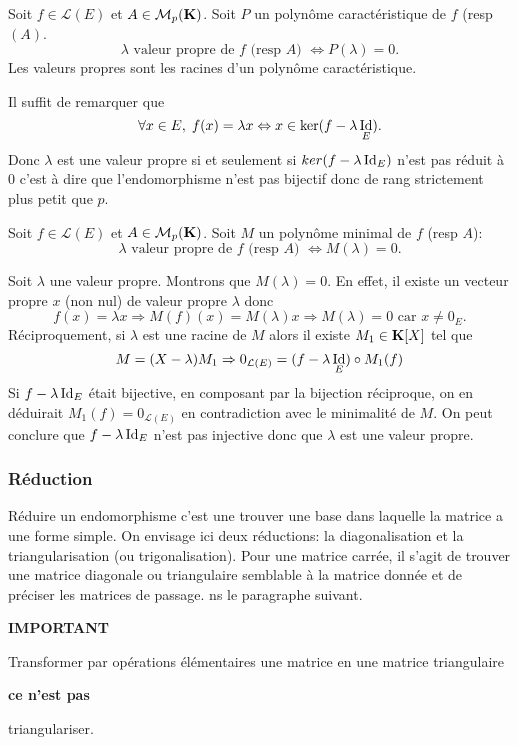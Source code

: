 \begin{propn} \label{polycarac}
  Soit $f \in \mathcal{L}(E)$ et $A \in \mathcal{M}_p(\mathbf{K})$. Soit $P$ un polynôme caractéristique de $f$ (resp $(A)$.
\[
  \lambda \text{ valeur propre de } f \text{ (resp $A$) } \Leftrightarrow P(\lambda) = 0.
\]
Les valeurs propres sont les racines d'un polynôme caractéristique.
\end{propn}
\begin{demo}
  Il suffit de remarquer que 
\[
  \forall x \in E, \; f(x) = \lambda x \Leftrightarrow x \in \ker(f - \lambda \mathop{\mathrm{Id}}_E).
\]
Donc $\lambda$ est une valeur propre si et seulement si $ker(f - \lambda \mathop{\mathrm{Id}}_E)$ n'est pas réduit à $0$ c'est à dire que l'endomorphisme n'est pas bijectif donc de rang strictement plus petit que $p$.
\end{demo}
\begin{propn} \label{vpracpolmin}
  Soit $f \in \mathcal{L}(E)$ et $A \in \mathcal{M}_p(\mathbf{K})$. Soit $M$ un polynôme minimal de $f$ (resp $A$):
\[
  \lambda \text{ valeur propre de } f \text{ (resp $A$) } \Leftrightarrow M(\lambda) = 0.
\]
\end{propn}
\begin{demo}
  Soit $\lambda$ une valeur propre. Montrons que $M(\lambda) = 0$.\newline
  En effet, il existe un vecteur propre $x$ (non nul) de valeur propre $\lambda$ donc 
\[
  f(x) = \lambda x \Rightarrow M(f)(x) = M(\lambda) x \Rightarrow M(\lambda) = 0 \text{ car } x\neq 0_E.
\]
Réciproquement, si $\lambda$ est une racine de $M$ alors il existe $M_1 \in \mathbf{K}[X]$ tel que 
\[
  M = (X- \lambda) M_1 \Rightarrow 0_{\mathcal{L}(E)} = (f - \lambda \mathop{\mathrm{Id}}_E) \circ M_1(f)
\] 
Si $f - \lambda \mathop{\mathrm{Id}}_E$ était bijective, en composant par la bijection réciproque, on en déduirait $M_1(f) = 0_{\mathcal{L}(E)}$ en contradiction avec le minimalité de $M$. On peut conclure que $f - \lambda \mathop{\mathrm{Id}}_E$ n'est pas injective donc que $\lambda$ est une valeur propre.
\end{demo}


\subsubsection{Réduction}
 
Réduire un endomorphisme c'est une trouver une base dans laquelle la matrice a une forme simple. On envisage ici deux réductions: la diagonalisation et la triangularisation (ou trigonalisation). Pour une matrice carrée, il s'agit de trouver une matrice diagonale ou triangulaire semblable à la matrice donnée et de préciser les matrices de passage.
ns le paragraphe suivant.
\begin{center}
  \begin{Large}\textbf{IMPORTANT}\end{Large}\newline
  Transformer par opérations élémentaires une matrice en une matrice triangulaire \begin{large}\textbf{ce n'est pas}\end{large} triangulariser.
\end{center}


